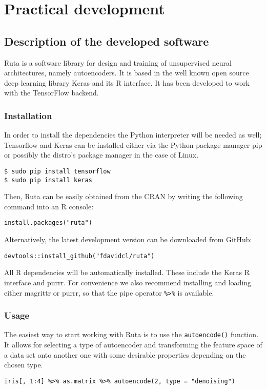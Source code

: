 \documentclass[oneside,openright,titlepage,numbers=noenddot,openany,headinclude,footinclude=true,
cleardoublepage=empty,abstractoff,BCOR=5mm,paper=a4,fontsize=12pt,main=spanish]{scrreprt}
\begin{document}
\part{Practical development}
\label{p.practice}

\chapter{Description of the developed software}

Ruta is a software library for design and training of unsupervised neural architectures, namely autoencoders. It is based in the well known open source deep learning library Keras \cite{Keras} and its R interface. It has been developed to work with the TensorFlow \cite{Tensorflow} backend.

\section{Installation}

In order to install the dependencies the Python interpreter will be needed as well; Tensorflow and Keras can be installed either via the Python package manager pip or possibly the distro’s package manager in the case of Linux.
\begin{verbatim}
$ sudo pip install tensorflow
$ sudo pip install keras
\end{verbatim}

Then,  Ruta can be easily obtained from the CRAN by writing the following command into an R console:
\begin{verbatim}
install.packages("ruta")  
\end{verbatim}

Alternatively, the latest development version can be downloaded from GitHub:
\begin{verbatim}
devtools::install_github("fdavidcl/ruta")
\end{verbatim}

All R dependencies will be automatically installed. These include the Keras R interface and purrr. For convenience we also recommend installing and loading either magrittr or purrr, so that the pipe operator \texttt{\%>\%} is available.

\section{Usage}

The easiest way to start working with Ruta is to use the \texttt{autoencode()} function. It allows for selecting a type of autoencoder and transforming the feature space of a data set onto another one with some desirable properties depending on the chosen type.
\begin{verbatim}
iris[, 1:4] %>% as.matrix %>% autoencode(2, type = "denoising")  
\end{verbatim}
\end{document}
